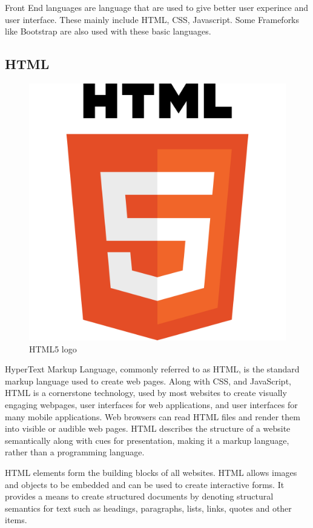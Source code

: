 
Front End languages are language that are used to give better user experince and user interface. These mainly include HTML, CSS, Javascript. Some Frameforks like Bootstrap are also used with these basic languages.
\subsection{HTML}

\begin{figure}[h]
\centering \includegraphics[scale=0.05]{images/HTML.png}
\caption{HTML5 logo}
\end{figure}
HyperText Markup Language, commonly referred to as HTML, is the standard markup language used to create web pages. Along with CSS, and JavaScript, HTML is a cornerstone technology, used by most websites to create visually engaging webpages, user interfaces for web applications, and user interfaces for many mobile applications. Web browsers can read HTML files and render them into visible or audible web pages. HTML describes the structure of a website semantically along with cues for presentation, making it a markup language, rather than a programming language.


HTML elements form the building blocks of all websites. HTML allows images and objects to be embedded and can be used to create interactive forms. It provides a means to create structured documents by denoting structural semantics for text such as headings, paragraphs, lists, links, quotes and other items.

